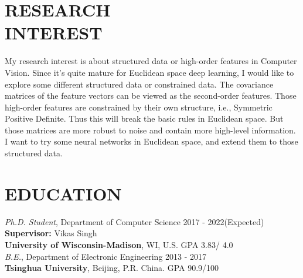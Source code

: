 \documentclass[margin]{res}
\begin{document}
\begin{resume}
\section{RESEARCH \\ INTEREST}
                My research interest is about structured data or high-order features in Computer Vision. Since it's quite mature for Euclidean space deep learning, I would like to explore some different structured data or constrained data. The covariance matrices of the feature vectors can be viewed as the second-order features. Those high-order features are constrained by their own structure, i.e., Symmetric Positive Definite. Thus this will break the basic rules in Euclidean space. But those matrices are more robust to noise and contain more high-level information. I want to try some neural networks in Euclidean space, and extend them to those structured data.

\section{EDUCATION} 
                {\sl {Ph.D. Student}}, Department of Computer Science \hfill 2017 - 2022(Expected)\\
                {\bf Supervisor:} Vikas Singh\\
                {\bf University of Wisconsin-Madison}, WI, U.S. \hfill GPA 3.83/ 4.0\\
                {\sl {B.E.}}, Department of Electronic Engineering \hfill 2013 - 2017\\
                {\bf Tsinghua University}, Beijing, P.R. China. \hfill GPA 90.9/100
                

\end{resume}
\end{document}
